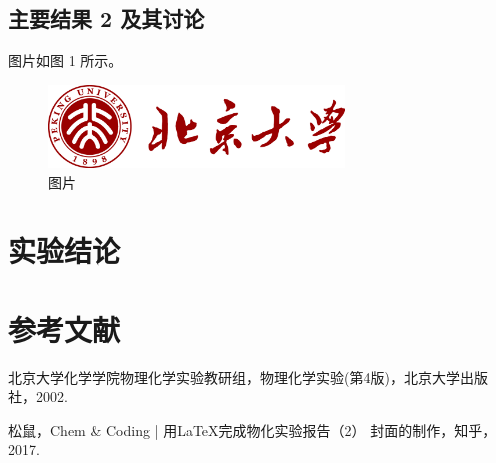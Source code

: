 \documentclass{pkupcl}
\begin{document}
\subsection{主要结果 2 及其讨论}

图片如图 1 所示。

\begin{figure}[!ht]
\begin{center}
\includegraphics[width=0.7\textwidth]{logo.png}
\caption{图片}
\end{center}
\end{figure}

\section{实验结论}

\section*{参考文献}

\begin{enumerate}[label={[\arabic*]}]
	\item 北京大学化学学院物理化学实验教研组，物理化学实验(第4版)，北京大学出版社，2002.
	\item 松鼠，Chem \& Coding | 用LaTeX完成物化实验报告（2） 封面的制作，知乎，2017.
\end{enumerate}
\end{document}

